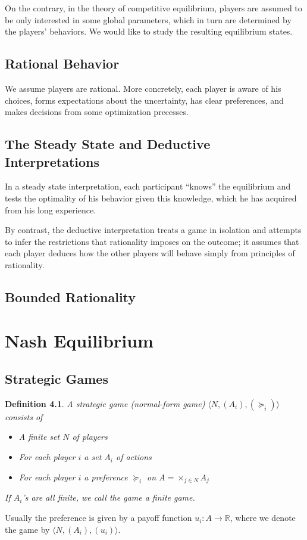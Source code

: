 \documentclass[openany]{book}
\newtheorem{definition}{Definition}[chapter]
\begin{document}
On the contrary, in the theory of competitive equilibrium, players are assumed to be only interested in some global parameters, which in turn are determined by the players' behaviors. We would like to study the resulting equilibrium states.

\section{Rational Behavior}
We assume players are rational. More concretely, each player is aware of his choices, forms expectations about the uncertainty, has clear preferences, and makes decisions from some optimization precesses.

\section{The Steady State and Deductive Interpretations}
In a steady state interpretation, each participant “knows” the equilibrium and tests the optimality of his behavior given this knowledge, which he has acquired from his long experience.

By contrast, the deductive interpretation treats a game in isolation and attempts to infer the restrictions that rationality imposes on the outcome; it assumes that each player deduces how the other players will behave simply from principles of rationality.

\section{Bounded Rationality}

\chapter{Nash Equilibrium}
\section{Strategic Games}
\begin{definition}
A strategic game (normal-form game) $\langle N,(A_i),(\succeq_i)\rangle$consists of
\begin{itemize}
\item A finite set $N$ of players
\item For each player $i$ a set $A_i$ of actions
\item For each player $i$ a preference $\succeq_i$ on $A=\times_{j\in N}A_j$
\end{itemize}
If $A_i$'s are all finite, we call the game a finite game.
\end{definition}
Usually the preference is given by a payoff function $u_i:A\rightarrow\mathbb{R}$, where we denote the game by $\langle N,(A_i),(u_i)\rangle$.
\end{document}

